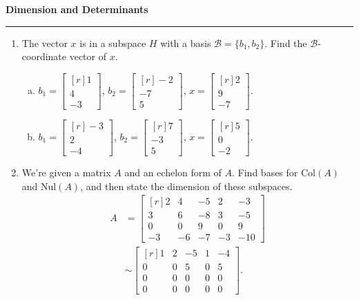 \documentclass[12pt]{article}
\begin{document}
\begin{center}
{\bf \Large Dimension and Determinants}
\vspace{0.2cm}
\hrule
\end{center}

\begin{multicols*}{2}
	\begin{enumerate}
		\item The vector $x$ is in a subspace $H$ with a basis $\mathcal{B} = \{b_1, b_2\}$. Find the $\mathcal{B}$-coordinate vector of $x$.
		\begin{enumerate}[(a)]
			\item $b_1 = \begin{bmatrix*}[r]
				1\\4\\-3
			\end{bmatrix*}$, $b_2 = \begin{bmatrix*}[r]
				-2\\-7\\5
			\end{bmatrix*}$, $x=\begin{bmatrix*}[r]
				2\\9\\-7
			\end{bmatrix*}$.
			\vfill

			\item $b_1 = \begin{bmatrix*}[r]
				-3\\2\\-4
			\end{bmatrix*}$, $b_2= \begin{bmatrix*}[r]
				7\\-3\\5
			\end{bmatrix*}$, $x=\begin{bmatrix*}[r]
				5\\0\\-2
			\end{bmatrix*}$.
		\end{enumerate}
		\vfill
		\item We're given a matrix $A$ and an echelon form of $A$. Find bases for Col$(A)$ and Nul$(A)$, and then state the dimension of these subspaces.
		\begin{align*}
		A &= \begin{bmatrix*}[r]
			2 & 4 & -5 & 2 & -3\\
			3 & 6 & -8 & 3 & -5\\
			0 & 0 & 9 & 0 & 9\\
			-3 & -6 & -7 & -3 & -10
		\end{bmatrix*} \\&\sim \begin{bmatrix*}[r]
			1 & 2 & -5 & 1 & -4\\
			0 & 0 & 5 & 0 & 5\\
			0 & 0 & 0 & 0 & 0\\
			0 & 0 & 0 & 0 & 0
		\end{bmatrix*}.
		\end{align*}
		\vfill


\end{enumerate}
\end{multicols*}
\end{document}
